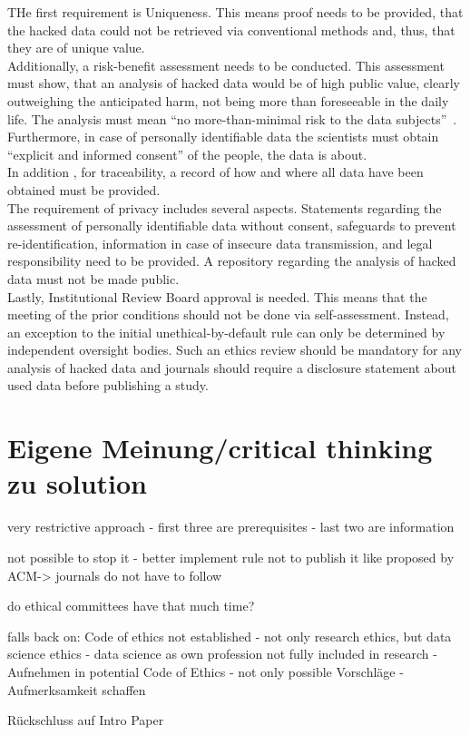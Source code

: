 THe first requirement is Uniqueness.
This means proof needs to be provided, that the hacked data could not be retrieved via conventional methods and, thus, that they are of unique value.\\
Additionally, a risk-benefit assessment needs to be conducted.
This assessment must show, that an analysis of hacked data would be of high public value, clearly outweighing the anticipated harm, not being more than foreseeable in the daily life.
The analysis must mean ``no more-than-minimal risk to the data subjects''~\parencite[][747]{nature}.\\
Furthermore, in case of personally identifiable data the scientists must obtain ``explicit and informed consent'' of the people, the data is about.\\
In addition , for traceability, a record of how and where all data have been obtained must be provided.\\
The requirement of privacy includes several aspects.
Statements regarding the assessment of personally identifiable data without consent, safeguards to prevent re-identification, information in case of insecure data transmission, and legal responsibility need to be provided.
A repository regarding the analysis of hacked data must not be made public.\\
Lastly, Institutional Review Board approval is needed.
This means that the meeting of the prior conditions should not be done via self-assessment.
Instead, an exception to the initial unethical-by-default rule can only be determined by independent oversight bodies.
Such an ethics review should be mandatory for any analysis of hacked data and journals should require a disclosure statement about used data before publishing a study.

\section*{Eigene Meinung/critical thinking zu solution}

very restrictive approach
- first three are prerequisites
- last two are information

not possible to stop it
- better implement rule not to publish it like proposed by ACM-> journals do not have to follow

do ethical committees have that much time?

falls back on:
Code of ethics not established
- not only research ethics, but data science ethics
- data science as own profession not fully included in research
- Aufnehmen in potential Code of Ethics
  - not only possible Vorschläge
- Aufmerksamkeit schaffen


Rückschluss auf Intro Paper
